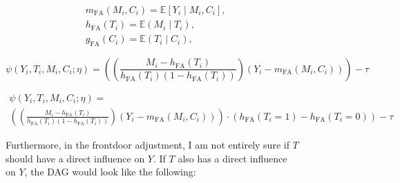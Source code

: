 \documentclass{article}
\numberwithin{equation}{section}
\newenvironment{colorparagraph}[1]{\par\color{#1}}{\par}
\begin{document}
{\begin{colorparagraph}{annotationcolor}
\begin{figure}[H]
{\begin{minipage}{0.99\textwidth}
        \vspace{0.3cm}
        \begin{align}
            & m_{\text{FA}}(M_i, C_i) = \mathbb{E}[Y_i \mid M_i, C_i],
            \label{eq:m_x_for_target_frontdoor_adjustment} \\
            & h_{\text{FA}}(T_i) = \mathbb{E}(M_i \mid T_i),
            \label{eq:h_x_for_mediator_frontdoor_adjustment} \\
            & g_{\text{FA}}(C_i) = \mathbb{E}(T_i \mid C_i),
            \label{eq:g_x_for_treatment_frontdoor_adjustment}
        \end{align}

        \begin{equation}
            \psi(Y_i, T_i, M_i, C_i; \eta) = \left(
                \left( \frac{M_i - h_{\text{FA}}(T_i)}{h_{\text{FA}}(T_i)(1 - h_{\text{FA}}(T_i))} \right) (Y_i - m_{\text{FA}}(M_i, C_i))
            \right) - \tau 
        \end{equation}

        \begin{equation}
            \begin{split}
                \psi(Y_i, T_i, M_i, C_i; \eta) = \\ \left(
                \left(
                    \frac{M_i - h_{\text{FA}}(T_i)}{h_{\text{FA}}(T_i)(1 - h_{\text{FA}}(T_i))}
                \right) (Y_i - m_{\text{FA}}(M_i, C_i))
                \right)
                \cdot \left(
                    h_{\text{FA}}(T_i = 1) - h_{\text{FA}}(T_i = 0)
                \right)
                - \tau
            \end{split}
        \end{equation}

        Furthermore, in the frontdoor adjustment, I am not entirely sure if $T$ should have a direct influence on $Y$. If $T$ also has a direct influence on $Y$, the DAG would look like the following:

        \begin{figure}[H]
            \centering
\end{figure}
\end{minipage}}
\end{figure}
\end{colorparagraph}}
\end{document}
